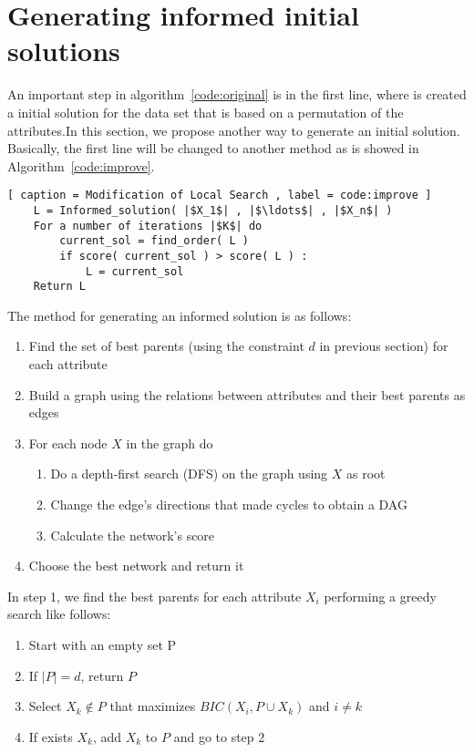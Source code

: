 \section{Generating informed initial solutions}
\label{sec:improve}

An important step in algorithm~\ref{code:original} is in the first line, where is created a initial solution for the data set that is based on a permutation of the attributes.In this section, we propose another way to generate an initial solution. Basically, the first line will be changed to another method as is showed in Algorithm~\ref{code:improve}.

\begin{lstlisting}[ caption = Modification of Local Search , label = code:improve ]
	L = Informed_solution( |$X_1$| , |$\ldots$| , |$X_n$| )
	For a number of iterations |$K$| do
		current_sol = find_order( L )
		if score( current_sol ) > score( L ) :
			L = current_sol
	Return L
\end{lstlisting}

The method for generating an informed solution is as follows:
\begin{enumerate}
	\item Find the set of best parents (using the constraint $d$ in previous section) for each attribute
	\item Build a graph using the relations between attributes and their best parents as edges
	\item For each node $X$ in the graph do
		\begin{enumerate}
			\item Do a depth-first search (DFS) on the graph using $X$ as root
			\item Change the edge's directions that made cycles to obtain a DAG
			\item Calculate the network's score
		\end{enumerate}
	\item Choose the best network and return it
\end{enumerate}

In step 1, we find the best parents for each attribute $X_i$ performing a greedy search like follows:
\begin{enumerate}
	\item Start with an empty set P
	\item If $|P| = d$, return $P$
	\item Select $X_k \not \in P$ that maximizes ${BIC}( X_i , P \cup X_k )$ and $i \neq k$
	\item If exists $X_k$, add $X_k$ to $P$ and go to step 2
\end{enumerate}

